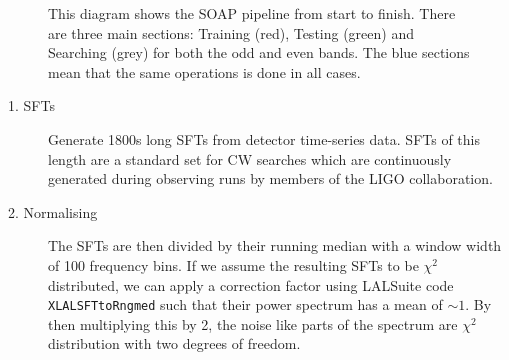%
\begin{figure}[htp]
	\centering
	\scalebox{0.7}{
			\centering
		}
	\caption[Flow diagram for entire SOAP and \gls{CNN} search.]{\label{machine:pipeline:flow} This diagram shows the SOAP pipeline from start to finish. There are three main sections: Training (red), Testing (green) and Searching (grey) for both the odd and even bands. The blue sections mean that the same operations is done in all cases.}
	
\end{figure}

%
\begin{description}
	\item[1. SFTs] Generate 1800s long \glspl{SFT} from detector time-series
	data. \glspl{SFT} of this length are a standard set for \gls{CW} searches which are continuously generated during observing runs by members of the \gls{LIGO} collaboration. 
	\item[2. Normalising] The \glspl{SFT} are then divided by their running median with a window width of 100 frequency bins.
	If we assume the resulting \glspl{SFT} to be $\chi^2$ distributed, we can apply a correction factor using LALSuite code {\tt XLALSFTtoRngmed} \cite{ligoscientificcollaboration2018LIGOAlgorithm} such that their power spectrum has a mean of $\sim 1$. 
	By then multiplying this by 2, the noise like parts of the spectrum are $\chi^2$ distribution with two degrees of freedom.
	

\end{description}
